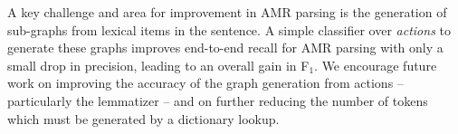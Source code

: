 \documentclass[11pt]{article}
\newcommand\n[1]{\textit{#1}} %
\begin{document}

A key challenge and area for improvement in AMR parsing is the
  generation of sub-graphs from lexical items in the sentence.
A simple classifier over \textit{actions} to generate
  these graphs improves end-to-end recall for AMR parsing with only a small
  drop in precision, leading to an overall gain in F$_1$.
We encourage future work on improving the accuracy of the graph generation from
  actions -- particularly the lemmatizer -- and on further reducing the number of
  tokens which must be generated by a dictionary lookup.

%






\end{document}
